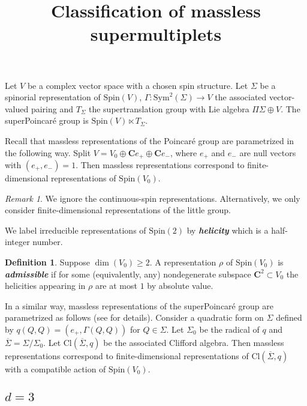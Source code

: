 \documentclass[12pt]{amsart}
\newcommand{\C}{\mathbf{C}}
\newcommand{\Cl}{\mathrm{Cl}}
\newcommand{\Spin}{\mathrm{Spin}}
\newcommand{\Sym}{\mathrm{Sym}}
\newcommand{\defterm}[1]{\textbf{\emph{#1}}}
\theoremstyle{definition}
\newtheorem{defn}[thm]{Definition}
\theoremstyle{remark}
\newtheorem{remark}[thm]{Remark}
\begin{document}
\title{Classification of massless supermultiplets}
\maketitle

\section{}

Let $V$ be a complex vector space with a chosen spin structure. Let $\Sigma$ be a spinorial representation of $\Spin(V)$, $\Gamma\colon \Sym^2(\Sigma)\rightarrow V$ the associated vector-valued pairing and $T_\Sigma$ the supertranslation group with Lie algebra $\Pi\Sigma\oplus V$. The superPoincar\'{e} group is $\Spin(V)\ltimes T_\Sigma$.

Recall that massless representations of the Poincar\'{e} group are parametrized in the following way. Split $V = V_0\oplus \C e_+\oplus \C e_-$, where $e_+$ and $e_-$ are null vectors with $(e_+, e_-) = 1$. Then massless representations correspond to finite-dimensional representations of $\Spin(V_0)$.

\begin{remark}
We ignore the continuous-spin representations. Alternatively, we only consider finite-dimensional representations of the little group.
\end{remark}

We label irreducible representations of $\Spin(2)$ by \defterm{helicity} which is a half-integer number.

\begin{defn}
Suppose $\dim(V_0)\geq 2$. A representation $\rho$ of $\Spin(V_0)$ is \defterm{admissible} if for some (equivalently, any) nondegenerate subspace $\C^2\subset V_0$ the helicities appearing in $\rho$ are at most $1$ by absolute value.
\end{defn}

In a similar way, massless representations of the superPoincar\'{e} group are parametrized as follows (see \cite[Lecture 6]{Freed} for details). Consider a quadratic form on $\Sigma$ defined by $q(Q, Q) = (e_+, \Gamma(Q, Q))$ for $Q\in \Sigma$. Let $\Sigma_0$ be the radical of $q$ and $\overline{\Sigma} = \Sigma / \Sigma_0$. Let $\Cl(\overline{\Sigma}, q)$ be the associated Clifford algebra. Then massless representations correspond to finite-dimensional representations of $\Cl(\overline{\Sigma}, q)$ with a compatible action of $\Spin(V_0)$.

\subsection{$d=3$}
\end{document}
